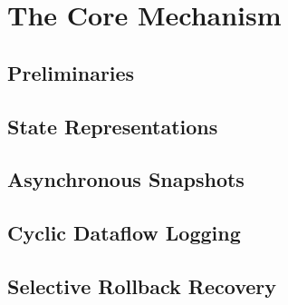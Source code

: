 
\section{The Core Mechanism}

\subsection{Preliminaries}

\subsection{State Representations}

\subsection{Asynchronous Snapshots}

\subsection{Cyclic Dataflow Logging}

\subsection{Selective Rollback Recovery}